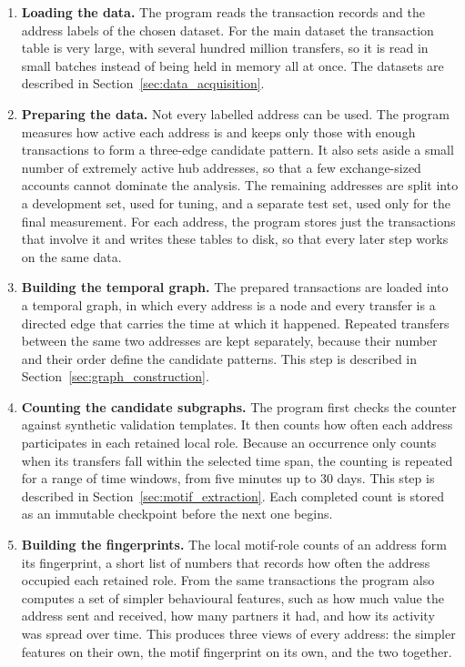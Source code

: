 \begin{enumerate}
  \item \textbf{Loading the data.} The program reads the transaction records and
        the address labels of the chosen dataset. For the main dataset the
        transaction table is very large, with several hundred million transfers,
        so it is read in small batches instead of being held in memory all at
        once. The datasets are described in Section~\ref{sec:data_acquisition}.

  \item \textbf{Preparing the data.} Not every labelled address can be used. The
        program measures how active each address is and keeps only those with
        enough transactions to form a three-edge candidate pattern. It also sets aside a small
        number of extremely active hub addresses, so that a few exchange-sized
        accounts cannot dominate the analysis. The remaining addresses are split
        into a development set, used for tuning, and a separate test set, used
        only for the final measurement. For each address, the program stores just
        the transactions that involve it and writes these tables to
        disk, so that every later step works on the same data.

  \item \textbf{Building the temporal graph.} The prepared transactions are
        loaded into a temporal graph, in which every address is a node and every
        transfer is a directed edge that carries the time at which it happened.
        Repeated transfers between the same two addresses are kept separately,
        because their number and their order define the candidate patterns.
        This step is described in Section~\ref{sec:graph_construction}.

  \item \textbf{Counting the candidate subgraphs.} The program first checks the
        counter against synthetic validation templates. It then counts how
        often each address participates in each retained local role.
        Because an occurrence only counts when its transfers fall within the
        selected time span, the counting is repeated for a range of time windows,
        from five minutes up to 30 days. This step is described in
        Section~\ref{sec:motif_extraction}. Each completed count is stored as an
        immutable checkpoint before the next one begins.

  \item \textbf{Building the fingerprints.} The local motif-role counts of an address form
        its fingerprint, a short list of numbers that records how often the
        address occupied each retained role. From the same transactions the program
        also computes a set of simpler behavioural features, such as how much
        value the address sent and received, how many partners it had, and how
        its activity was spread over time. This produces three views of every
        address: the simpler features on their own, the motif fingerprint on its
        own, and the two together.


\end{enumerate}
